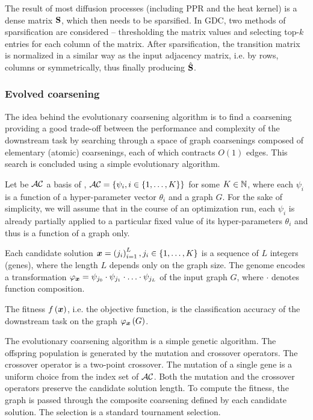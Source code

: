 The result of most diffusion processes (including PPR and the heat kernel) is a dense matrix \( \mathbf{S} \), which then needs to be sparsified. In GDC, two methods of sparsification are considered -- thresholding the matrix values and selecting top-\( k \) entries for each column of the matrix. After sparsification, the transition matrix is normalized in a similar way as the input adjacency matrix, i.e. by rows, columns or symmetrically, thus finally producing \( \hat{\mathbf{S}} \).

\subsubsection{Evolved coarsening}

The idea behind the evolutionary coarsening algorithm is to find a coarsening providing a good trade-off between the performance and complexity of the downstream task by searching through a space of graph coarsenings composed of elementary (atomic) coarsenings, each of which contracts \( O(1) \) edges. This search is concluded using a simple evolutionary algorithm.

Let be \( \mathcal{AC} \) a basis of , \( \mathcal{AC} = \left\{\psi_i, i \in \left\{1, \dots, K \right\} \right\} \) for some \( K \in \mathbb{N} \), where each \( \psi_i \) is a function of a hyper-parameter vector \( \theta_i \) and a graph \( G \). For the sake of simplicity, we will assume that in the course of an optimization run, each \( \psi_i \) is already partially applied to a particular fixed value of its hyper-parameters \( \theta_i \) and thus is a function of a graph only.

Each candidate solution \( \bm{x} = \left( j_i \right)_{i = 1}^L, j_i \in \left\{1, \dots, K \right\} \) is a sequence of \( L \) integers (genes), where the length \( L \) depends only on the graph size. The genome encodes a transformation \( \varphi_{\bm{x}} = \psi_{j_0} \cdot \psi_{j_1} \cdot \ldots \cdot \psi_{j_L} \) of the input graph \( G \), where \( \cdot \) denotes function composition.

The fitness \( f \left( \bm{x} \right) \), i.e. the objective function, is the classification accuracy of the downstream task on the graph \( \varphi_{\bm{x}} \left( G \right) \).

The evolutionary coarsening algorithm is a simple genetic algorithm. The offspring population is generated by the mutation and crossover operators. The crossover operator is a two-point crossover. The mutation of a single gene is a uniform choice from the index set of \( \mathcal{AC} \). Both the mutation and the crossover operators preserve the candidate solution length. To compute the fitness, the graph is passed through the composite coarsening defined by each candidate solution. The selection is a standard tournament selection.

